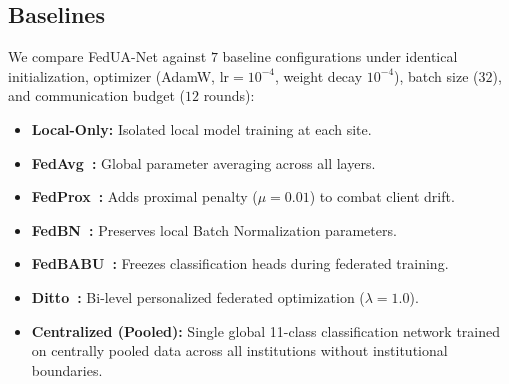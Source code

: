 \documentclass[journal]{IEEEtran}
\begin{document}
\subsection{Baselines}
We compare FedUA-Net against $7$ baseline configurations under identical initialization, optimizer (AdamW, $\text{lr}=10^{-4}$, weight decay $10^{-4}$), batch size ($32$), and communication budget ($12$ rounds):
\begin{itemize}
    \item \textbf{Local-Only:} Isolated local model training at each site.
    \item \textbf{FedAvg~\cite{mcmahan2017communication}:} Global parameter averaging across all layers.
    \item \textbf{FedProx~\cite{li2020federated}:} Adds proximal penalty ($\mu=0.01$) to combat client drift.
    \item \textbf{FedBN~\cite{li2021fedbn}:} Preserves local Batch Normalization parameters.
    \item \textbf{FedBABU~\cite{oh2022fedbabu}:} Freezes classification heads during federated training.
    \item \textbf{Ditto~\cite{li2021ditto}:} Bi-level personalized federated optimization ($\lambda=1.0$).
    \item \textbf{Centralized (Pooled):} Single global 11-class classification network trained on centrally pooled data across all institutions without institutional boundaries.
\end{itemize}
\end{document}
